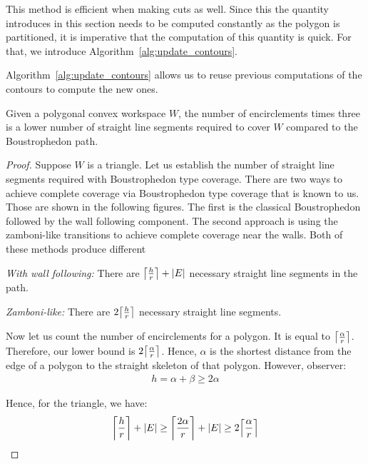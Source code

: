 \documentclass[../main.tex]{subfiles}
\begin{document}
This method is efficient when making cuts as well. Since this the quantity introduces in this section needs to be computed constantly as the polygon is partitioned, it is imperative that the computation of this quantity is quick. For that, we introduce Algorithm~\ref{alg:update_contours}.

Algorithm~\ref{alg:update_contours} allows us to reuse previous computations of the contours to compute the new ones.


\begin{proposition}
Given a polygonal convex workspace $W$, the number of encirclements times three is a lower number of straight line segments required to cover $W$ compared to the Boustrophedon path.
\end{proposition}
\begin{proof}

Suppose $W$ is a triangle. Let us establish the number of straight line segments required with Boustrophedon type coverage. There are two ways to achieve complete coverage via Boustrophedon type coverage that is known to us. Those are shown in the following figures. The first is the classical Boustrophedon followed by the wall following component. The second approach is using the zamboni-like transitions to achieve complete coverage near the walls. Both of these methods produce different 

\emph{With wall following:} There are $\ceil*{\frac{h}{r}}+|E|$ necessary straight line segments in the path.

\emph{Zamboni-like:} There are $2\ceil*{\frac{h}{r}}$ necessary straight line segments.

Now let us count the number of encirclements for a polygon. It is equal to $\ceil*{\frac{\alpha}{r}}$. Therefore, our lower bound is $2\ceil*{\frac{\alpha}{r}}$. Hence, $\alpha$ is the shortest distance from the edge of a polygon to the straight skeleton of that polygon. However, observer:
\begin{equation}
\begin{aligned}
h=\alpha+\beta\geq2\alpha
\end{aligned}
\end{equation}

Hence, for the triangle, we have:
\begin{equation}
\begin{aligned}
	\ceil*{\frac{h}{r}}+|E|\geq\ceil*{\frac{2\alpha}{r}}+|E|\geq2\ceil*{\frac{\alpha}{r}} 
\end{aligned}
\end{equation}


\end{proof}
\end{document}
